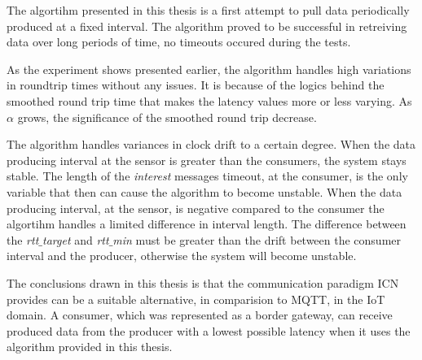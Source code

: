 The algortihm presented in this thesis is a first attempt to pull data periodically produced at a fixed interval. The algorithm proved to be successful in retreiving data over long periods of time, no timeouts occured during the tests. %

As the experiment shows presented earlier, the algorithm handles high variations in roundtrip times without any issues. It is because of the logics behind the smoothed round trip time that makes the latency values more or less varying. As $\alpha$ grows, the significance of the smoothed round trip decrease. 

The algorithm handles variances in clock drift to a certain degree. When the data producing interval at the sensor is greater than the consumers, the system stays stable. The length of the \textit{interest} messages timeout, at the consumer, is the only variable that then can cause the algorithm to become unstable. When the data producing interval, at the sensor, is negative compared to the consumer the algortihm handles a limited difference in interval length. The difference between the \textit{rtt$\_$target} and \textit{rtt$\_$min} must be greater than the drift between the consumer interval and the producer, otherwise the system will become unstable.

The conclusions drawn in this thesis is that the communication paradigm ICN provides can be a suitable alternative, in comparision to MQTT, in the IoT domain. A consumer, which was represented as a border gateway, can receive produced data from the producer with a lowest possible latency when it uses the algorithm provided in this thesis. 





